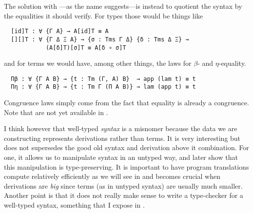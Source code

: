 The solution with ---as the name suggests---is instead to
quotient the syntax by the equalities it should verify.
For types those would be things like
\begin{verbatim}
  [id]T : ∀ {Γ A} → A[id]T ≡ A
  [][]T : ∀ {Γ Δ Ξ A} → {σ : Tms Γ Δ} {δ : Tms Δ Ξ} →
            (A[δ]T)[σ]T ≡ A[δ ∘ σ]T
\end{verbatim}
and for terms we would have, among other things, the laws for \(\beta\)- and
\(\eta\)-equality.
\begin{verbatim}
  Πβ : ∀ {Γ A B} → {t : Tm (Γ, A) B}  → app (lam t) ≡ t
  Πη : ∀ {Γ A B} → {t : Tm Γ (Π A B)} → lam (app t) ≡ t
\end{verbatim}
Congruence laws simply come from the fact that equality is already a congruence.
Note that  are not yet available in \Agda.

I think however that well-typed \emph{syntax} is a misnomer because the data we
are constructing represents derivations rather than terms.
It is very interesting but does not supersedes the good old syntax and
derivation above it combination.
For one, it allows us to manipulate syntax in an untyped way, and later show
that this manipulation is type-preserving. It is important to have program
translations compute relatively efficiently as we will see in
 and becomes crucial when derivations are
\emph{big} since terms (as in untyped syntax) are usually
much smaller. Another point is that it does not really make sense to write a
type-checker for a well-typed syntax, something that I expose in
.